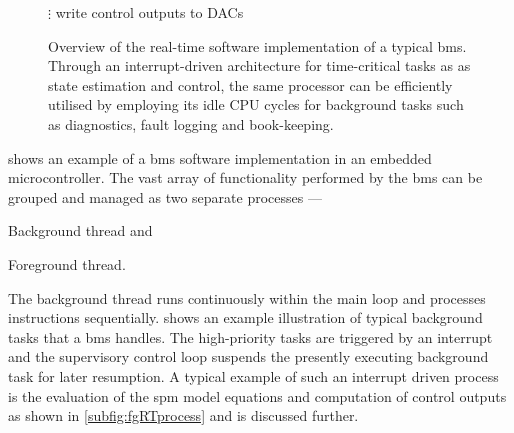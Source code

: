 \begin{figure}[!htbp]
{\begin{varwidth}[b]{0.65\linewidth}
\begin{flushright}
\begin{algorithmic}[0]
                    \EndFunction
                    \State $\vdots$
                    \State write control outputs to DACs
                    \EndFunction
                    \EndFunction
                    \END
                \end{algorithmic}
            \end{flushright}
        \end{varwidth}%
    }
    \centering
    \caption[Overview of real-time software implementation of a typical
    ]{Overview of the real-time software implementation of a typical
        \gls{bms}. Through an interrupt-driven architecture for time-critical tasks as
        as state estimation and control, the same processor can be
        efficiently utilised by employing its idle CPU cycles for background
    tasks such as diagnostics, fault logging and book-keeping.}
    \label{fig:basicRTCsoftwarearch}
\end{figure}

  shows  an  example   of  a  \gls{bms}  software
implementation in an  embedded microcontroller. The vast  array of functionality
performed by the \gls{bms} can be  grouped and managed as two separate processes
---
\begin{enumerate*}[label=\itshape\alph*\upshape)]
    \item Background thread and
    \item Foreground thread.
\end{enumerate*}
The   background   thread  runs   continuously   within   the  main   loop   and
processes instructions sequentially.   shows an example
illustration  of  typical  background  tasks   that  a  \gls{bms}  handles.  The
high-priority tasks  are triggered by  an interrupt and the  supervisory control
loop suspends  the presently executing  background task for later  resumption. A
typical  example of  such  an  interrupt driven  process  is  the evaluation  of
the  \gls{spm} model  equations  and  computation of  control  outputs as  shown
in \cref{subfig:fgRTprocess} and is discussed further.


